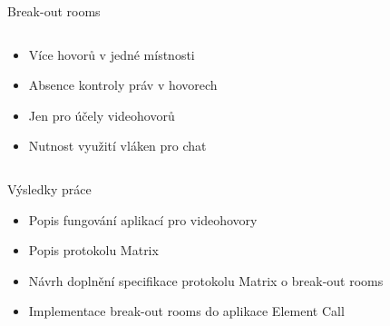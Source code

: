 \documentclass[aspectratio=169]{beamer}
\begin{document}
\begin{frame}{Break-out rooms}
\begin{columns}[T]
\begin{column}{0.5\textwidth}
            \begin{itemize}[<+->]
                \item Více hovorů v jedné místnosti
                \item Absence kontroly práv v hovorech
                \item Jen pro účely videohovorů
                \item Nutnost využití vláken pro chat
            \end{itemize}
        \end{column}
    \end{columns}
\end{frame}
\begin{frame}{Výsledky práce}
    \pause
    \begin{itemize}[<+->]
        \item Popis fungování aplikací pro videohovory
        \item Popis protokolu Matrix
        \item Návrh doplnění specifikace protokolu Matrix o break-out rooms
        \item Implementace break-out rooms do aplikace Element Call
    \end{itemize}
\end{frame}
\end{document}
